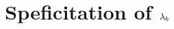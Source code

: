 \section{\texorpdfstring{Speficitation of \boldmath${\lambda_b}$}{Specification of the call-by-box lambda calculus}}









